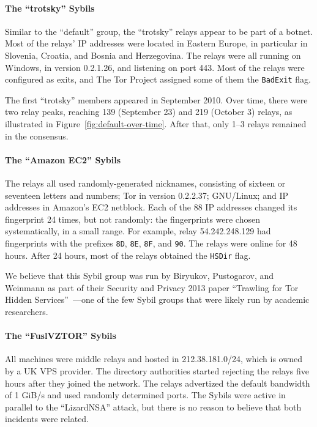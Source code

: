 \paragraph{The ``trotsky'' Sybils}
Similar to the ``default'' group, the ``trotsky'' relays appear to be part of
a botnet.  Most of the relays' IP addresses were located in Eastern Europe, in
particular in Slovenia, Croatia, and Bosnia and Herzegovina.  The relays were
all running on Windows, in version 0.2.1.26, and listening on port 443.  Most of
the relays were configured as exits, and The Tor Project assigned some of them
the \texttt{BadExit} flag.

The first ``trotsky'' members appeared in September 2010.  Over time, there were
two relay peaks, reaching 139 (September 23) and 219 (October 3) relays, as
illustrated in Figure~\ref{fig:default-over-time}.  After that, only 1--3 relays
remained in the consensus.

\paragraph{The ``Amazon EC2'' Sybils}
The relays all used randomly-generated nicknames, consisting of sixteen or
seventeen letters and numbers; Tor in version 0.2.2.37; GNU/Linux; and IP
addresses in Amazon's EC2 netblock.  Each of the 88 IP addresses changed its
fingerprint 24 times, but not randomly: the fingerprints were chosen
systematically, in a small range.  For example, relay 54.242.248.129 had
fingerprints with the prefixes \texttt{8D}, \texttt{8E}, \texttt{8F}, and
\texttt{90}.  The relays were online for 48 hours.  After 24 hours, most of the
relays obtained the \texttt{HSDir} flag.

We believe that this Sybil group was run by Biryukov, Pustogarov, and Weinmann
as part of their Security and Privacy 2013 paper ``Trawling for Tor Hidden
Services''~\cite{Biryukov2013a}---one of the few Sybil groups that were likely
run by academic researchers.

\paragraph{The ``FuslVZTOR'' Sybils}
All machines were middle relays and hosted in 212.38.181.0/24, which is owned by
a UK VPS provider.  The directory authorities started rejecting the relays five
hours after they joined the network.  The relays advertized the default bandwidth
of 1 GiB/s and used randomly determined ports.  The Sybils were active in
parallel to the ``LizardNSA'' attack, but there is no reason to believe that
both incidents were related.

